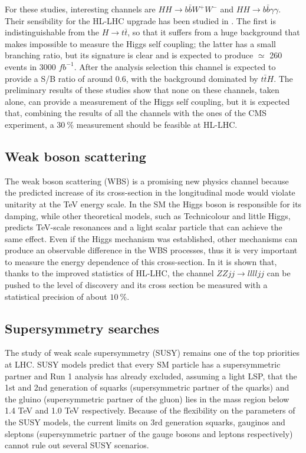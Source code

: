 \documentclass[a4paper,twoside,12pt]{article}
\begin{document}
For these studies, interesting channels are
$HH \rightarrow b\bar{b}W^+W^-$ and $HH \rightarrow b\bar{b}\gamma\gamma$. Their sensibility for the HL-LHC upgrade has been studied in \cite{HHStudies}. The first is 
indistinguishable from the $H \rightarrow t\bar{t}$, so that it suffers from a huge background
that makes impossible to measure the Higgs self coupling; the latter has a small branching
ratio, but its signature is clear and is expected to produce $\simeq$ 260 events in 3000 $fb^{-1}$. After the analysis selection this channel is expected to provide a S/B ratio of around 0.6, with the background
dominated by $t\bar{t}H$. The preliminary results of these
studies show that none on these channels, taken alone, can provide a measurement of
the Higgs self coupling, but it is expected that, combining the results of all the channels with 
the ones of the CMS experiment, a $30\ \%$ measurement should be feasible at HL-LHC.

\subsection{Weak boson scattering}
The weak boson scattering (WBS) is a promising new physics channel because the predicted increase of
its cross-section
in the longitudinal mode would violate unitarity at the TeV energy scale. In the SM the Higgs
boson is responsible for its damping, while other theoretical models, such as Technicolour and 
little Higgs, predicts TeV-scale resonances and a light scalar particle that can achieve the same effect. Even if the Higgs
mechanism was established, other mechanisms can produce an observable difference in
the WBS processes, thus it is very important to measure the energy 
dependence of this cross-section. In \cite{WBS} it is shown that, thanks to the improved
statistics of HL-LHC, the channel $ZZjj \rightarrow lllljj$ can be pushed to the level of discovery and its cross section be measured with a statistical precision of about $10\ \%$.

\subsection{Supersymmetry searches}
The study of weak scale supersymmetry (SUSY) remains one of the top priorities at LHC.
SUSY models predict that every SM particle has a supersymmetric partner and Run 1 analysis
has already excluded, assuming a light LSP, that the 1st and 2nd generation of squarks (supersymmetric partner of the quarks) and the gluino (supersymmetric partner of the gluon) lies in the mass region below 1.4 TeV and 1.0
TeV respectively. Because of the flexibility on the parameters of the SUSY models, 
the current limits on 3rd generation squarks, gauginos and sleptons (supersymmetric partner
of the gauge bosons and leptons respectively) cannot rule out several SUSY scenarios.\\
\end{document}
